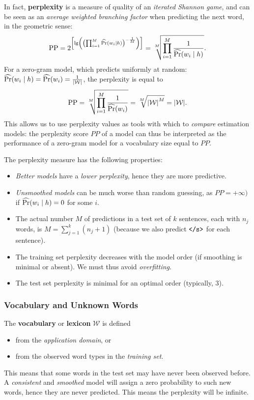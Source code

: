 In fact, \textbf{perplexity} is a measure of quality of an \emph{iterated Shannon game}, and can be seen as an \emph{average weighted branching factor} when predicting the next word, in the geometric sense:
\[
\textnormal{PP} = 2^{\left[\lg\left(\left(\prod_{i=1}^M \operatorname{\widehat{\Pr}}(w_i \mid h)\right)^{-\frac{1}{M}}\right)\right]} = \sqrt[M]{\prod_{i=1}^M \frac{1}{\operatorname{\widehat{\Pr}}(w_i \mid h)}}.
\]
For a zero-gram model, which predicts uniformly at random: \(\operatorname{\widehat{\Pr}}(w_i \mid h) = \operatorname{\widehat{\Pr}}(w_i) = \frac{1}{{\left\lvert\mathcal{W}\right\lvert}}\), the perplexity is equal to
\[
\textnormal{PP} = \sqrt[M]{\prod_{i=1}^M \frac{1}{\operatorname{\widehat{\Pr}}(w_i)}} = \sqrt[M]{{\left\lvert\mathcal{W}\right\lvert}^M} = {\left\lvert\mathcal{W}\right\lvert}.
\]
This allows us to use perplexity values as tools with which to \emph{compare} estimation models: the perplexity score \(PP\) of a model can thus be interpreted as the performance of a zero-gram model for a vocabulary size equal to \(PP\).

The perplexity measure has the following properties:
\begin{itemize}
	\item \emph{Better models} have a \emph{lower perplexity}, hence they are more predictive.
	\item \emph{Unsmoothed models} can be much worse than random guessing, as \(PP = +\infty)\) if \(\operatorname{\widehat{\Pr}}(w_i \mid h) = 0\) for some \(i\).
	\item The actual number \(M\) of predictions in a test set of \(k\) sentences, each with \(n_j\) words, is \(M = \sum_{j = 1}^k (n_j + 1)\) (because we also predict \(\texttt{</s>}\) for each sentence).
	\item The training set perplexity decreases with the model order (if smoothing is minimal or absent).
	We must thus avoid \emph{overfitting}.
	\item The test set perplexity is minimal for an optimal order (typically, \(3\)).
\end{itemize}

\subsubsection{Vocabulary and Unknown Words}
The \textbf{vocabulary} or \textbf{lexicon} \(\mathcal{W}\) is defined
\begin{itemize}
	\item from the \emph{application domain}, or
	\item from the observed word types in the \emph{training set}.
\end{itemize}
This means that some words in the test set may have never been observed before.
A \emph{consistent} and \emph{smoothed} model will assign a zero probability to such new words, hence they are never predicted.
This means the perplexity will be infinite.

